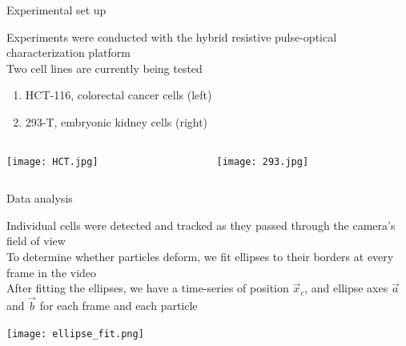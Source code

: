 
\begin{frame}[c]{Experimental set up}

	Experiments were conducted with the hybrid resistive pulse-optical characterization platform \\
	Two cell lines are currently being tested \\
	\begin{enumerate}
		\item HCT-116, colorectal cancer cells (left)
		\item 293-T, embryonic kidney cells (right)
	\end{enumerate}
	
	\begin{columns}[t]
		
		\begin{column}[T]{2.25in}
			{\centering
				\texttt{[image: HCT.jpg]} \\
				\par
			}
		\end{column}
		
		\begin{column}[T]{2.25in}
			{\centering
				\texttt{[image: 293.jpg]} \\
				\par
			}
		\end{column}

	\end{columns}

	
	
	

	
\end{frame}


\begin{frame}[c]{Data analysis}

	Individual cells were detected and tracked as they passed through the camera's field of view \\
	To determine whether particles deform, we fit ellipses to their borders at every frame in the video \\
	After fitting the ellipses, we have a time-series of position $\vec{x}_{c}$, and ellipse axes $\vec{a}$ and $\vec{b}$ for each frame and each particle
	
	\texttt{[image: ellipse\_fit.png]}
	
\end{frame}

